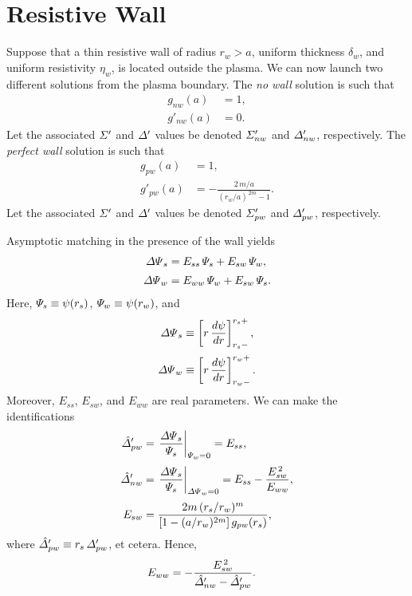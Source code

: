 \documentclass[notitlepage,12pt]{article}
\begin{document}
\section{Resistive Wall}
Suppose that a thin resistive wall of radius $r_w>a$, uniform thickness $\delta_w$, and uniform resistivity $\eta_w$, is located outside the
plasma. We can now launch two different solutions from the plasma boundary.
The {\em no wall}\/ solution is such that
\begin{align}
g_{nw}(a) &= 1,\\[0.5ex]
g'_{nw}(a) &= 0.
\end{align}
Let the associated ${\mit\Sigma}'$ and ${\mit\Delta}'$ values be denoted ${\mit\Sigma}'_{nw}$ and ${\mit\Delta}'_{nw}$,
respectively. 
The {\em perfect wall}\/ solution is such that
\begin{align}
g_{pw}(a) &= 1,\\[0.5ex]
g'_{pw}(a) &= -\frac{2\,m/a}{(r_w/a)^{\,2m}-1}.
\end{align}
Let the associated ${\mit\Sigma}'$ and ${\mit\Delta}'$ values be denoted ${\mit\Sigma}'_{pw}$ and ${\mit\Delta}'_{pw}$,
respectively. 

Asymptotic matching in the presence of the wall yields
\begin{align}
{\mit\Delta\Psi}_s&= E_{ss}\,{\mit\Psi}_s + E_{sw}\,{\mit\Psi}_w,\\[0.5ex]
{\mit\Delta\Psi}_w &= E_{ww}\,{\mit\Psi}_w + E_{sw}\,{\mit\Psi}_s.
\end{align}
Here, ${\mit\Psi}_s\equiv \psi(r_s)$, ${\mit\Psi}_w\equiv \psi(r_w)$, and 
\begin{align}
{\mit\Delta\Psi}_s&\equiv\left[r\,\frac{d\psi}{dr}\right]_{r_s-}^{r_s+},\\[0.5ex]
{\mit\Delta\Psi}_w&\equiv\left[r\,\frac{d\psi}{dr}\right]_{r_w-}^{r_w+}.
\end{align}
 Moreover, 
$E_{ss}$, $E_{sw}$, and $E_{ww}$ are real parameters. We can
make the identifications
\begin{align}
\hat{\mit\Delta}'_{pw} &= \left.\frac{{\mit\Delta\Psi}_s}{{\mit\Psi}_s}\right|_{{\mit\Psi}_w=0}=E_{ss},\\[0.5ex]
\hat{\mit\Delta}'_{nw} &= \left.\frac{{\mit\Delta\Psi}_s}{{\mit\Psi}_s}\right|_{{\mit\Delta\Psi}_w=0}=E_{ss}- \frac{E_{sw}^{\,2}}{E_{ww}},\\[0.5ex]
E_{sw} &= \frac{2m\,(r_s/r_w)^m}{[1-(a/r_w)^{2m}]\,g_{pw}(r_s)},
\end{align}
where $\hat{\mit\Delta}'_{pw}\equiv r_s\,{\mit\Delta}'_{pw}$, et cetera. 
Hence,
\begin{align}
E_{ww} &= -\frac{E_{sw}^{\,2}}{\hat{\mit\Delta}'_{nw} -\hat{\mit\Delta}'_{pw}}.
\end{align}
\end{document}
